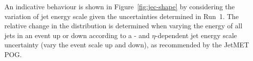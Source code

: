 An indicative behaviour is shown in Figure~\ref{fig:jec-shape} by
considering the variation of jet energy scale given the uncertainties
determined in Run~1. The relative change in the \mht distribution is
determined when varying the energy of all jets in an event up or down
according to a \pt- and $\eta$-dependent jet energy scale uncertainty
(\ie vary the event scale up and down), as recommended by the JetMET
POG. 


%
